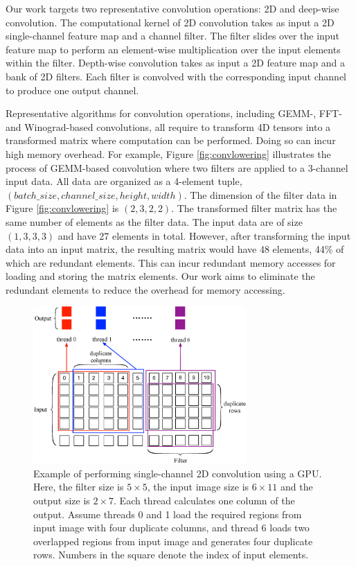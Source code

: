 Our work targets two representative convolution operations: 2D and deep-wise convolution. The computational kernel of 2D convolution takes
as input a 2D single-channel feature map and a channel filter. The filter slides over the input feature map to perform an element-wise
multiplication over the input elements within the filter. Depth-wise convolution takes as input a 2D feature map and a bank of 2D filters.
Each filter is convolved with the corresponding input channel to produce one output channel.



Representative algorithms for convolution operations, including GEMM-, FFT- and Winograd-based convolutions, all require to transform 4D
tensors into a transformed matrix where computation can be performed. Doing so can incur high memory overhead. For example, Figure
\ref{fig:convlowering} illustrates the process of GEMM-based convolution where two filters are applied to a 3-channel input data. All data
are organized as a 4-element tuple, $(batch\_size, channel\_size, height, width)$. The dimension of the filter data in Figure
\ref{fig:convlowering} is $(2, 3, 2, 2)$. The transformed filter matrix has the same number of elements as the filter data. The input data
are of size $(1, 3, 3, 3)$ and have 27 elements in total. However, after transforming the input data into an input matrix, the resulting
matrix would have 48 elements, 44\% of which are redundant elements. This can incur redundant memory accesses for loading and storing the
matrix elements. Our work aims to eliminate the redundant elements to reduce the overhead for memory accessing.



\begin{figure}[t!]
\centering
  \includegraphics[width=\columnwidth,height=6cm]{./figure/twostrategies.eps}
  \caption{Example of performing single-channel 2D convolution using a GPU. Here, the filter size is $5 \times 5$, the input image size is $6 \times 11$
  and the output size is $2 \times 7$. Each thread calculates one column of the output. Assume threads 0 and 1 load the required regions from input
  image with four duplicate columns, and thread 6 loads two overlapped regions from input image and generates four duplicate rows. Numbers in
  the square denote the index of input elements.}
  \label{fig:twostrategies}
\end{figure}
